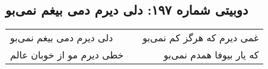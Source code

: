 \begin{center}
\section*{دوبیتی شماره ۱۹۷: دلی دیرم دمی بیغم نمی‌بو}
\label{sec:197}
\begin{longtable}{l p{0.5cm} r}
دلی دیرم دمی بیغم نمی‌بو
&&
غمی دیرم که هرگز کم نمی‌بو
\\
خطی دیرم مو از خوبان عالم
&&
که یار بیوفا همدم نمی‌بو
\\
\end{longtable}
\end{center}
